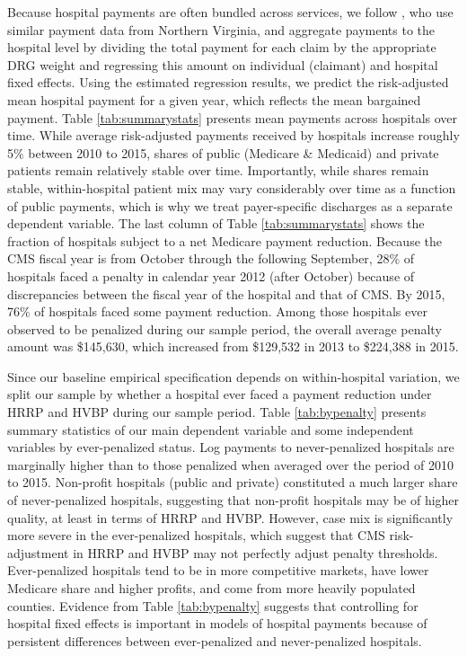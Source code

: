 \documentclass[12pt]{article}
\begin{document}
Because hospital payments are often bundled across services, we follow \citet{gowrisankaran2015}, who use similar payment data from Northern Virginia, and aggregate payments to the hospital level by dividing the total payment for each claim by the appropriate DRG weight and regressing this amount on individual (claimant) and hospital fixed effects.  Using the estimated regression results, we predict the risk-adjusted mean hospital payment for a given year, which reflects the mean bargained payment. Table \ref{tab:summarystats} presents mean payments across hospitals over time. While average risk-adjusted payments received by hospitals increase roughly 5$\%$ between 2010 to 2015, shares of public (Medicare \& Medicaid) and private patients remain relatively stable over time.  Importantly, while shares remain stable, within-hospital patient mix may vary considerably over time as a function of public payments, which is why we treat payer-specific discharges as a separate dependent variable.  The last column of Table \ref{tab:summarystats} shows the fraction of hospitals subject to a net Medicare payment reduction.  Because the CMS fiscal year is from October through the following September, 28$\%$ of hospitals faced a penalty in calendar year 2012 (after October) because of discrepancies between the fiscal year of the hospital and that of CMS.  By 2015, 76$\%$ of hospitals faced some payment reduction. Among those hospitals ever observed to be penalized during our sample period, the overall average penalty amount was \$145,630, which increased from \$129,532 in 2013 to \$224,388 in 2015.


Since our baseline empirical specification depends on within-hospital variation, we split our sample by whether a hospital ever faced a payment reduction under HRRP and HVBP during our sample period.  Table \ref{tab:bypenalty} presents summary statistics of our main dependent variable and some independent variables by ever-penalized status.  Log payments to never-penalized hospitals are marginally higher than to those penalized when averaged over the period of 2010 to 2015.  Non-profit hospitals (public and private) constituted a much larger share of never-penalized hospitals, suggesting that non-profit hospitals may be of higher quality, at least in terms of HRRP and HVBP.  However, case mix is significantly more severe in the ever-penalized hospitals, which suggest that CMS risk-adjustment in HRRP and HVBP may not perfectly adjust penalty thresholds.  Ever-penalized hospitals tend to be in more competitive markets, have lower Medicare share and higher profits, and come from more heavily populated counties.  Evidence from Table \ref{tab:bypenalty} suggests that controlling for hospital fixed effects is important in models of hospital payments because of persistent differences between ever-penalized and never-penalized hospitals.
\end{document}
